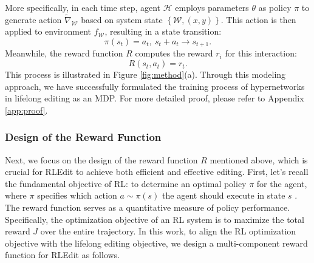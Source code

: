 More specifically, in each time step, agent $\mathcal{H}$ employs parameters $\theta$ as policy $\pi$ to generate action $\tilde{\nabla}_\mathcal{W}$ based on system state $\left\{\mathcal{W},\left(x,y\right)\right\}$. This action is then applied to environment $f_\mathcal{W}$, resulting in a state transition:
\begin{equation}
\pi (s_t)=a_t,\ s_t+a_t\rightarrow s_{t+1}.
\end{equation}
Meanwhile, the reward function $R$ computes the reward $r_i$ for this interaction:
\begin{equation}
R(s_t,a_t)=r_t.
\end{equation}
This process is illustrated in Figure \ref{fig:method}(a). Through this modeling approach, we have successfully formulated the training process of hypernetworks in lifelong editing as an MDP. For more detailed proof, please refer to Appendix \ref{app:proof}.

\subsubsection{Design of the Reward Function}
Next, we focus on the design of the reward function $R$ mentioned above, which is crucial for RLEdit to achieve both efficient and effective editing. First, let's recall the fundamental objective of RL: to determine an optimal policy $\pi$ for the agent, where $\pi$ specifies which action $a\sim\pi(s)$ the agent should execute in state $s$ \cite{rl}. The reward function serves as a quantitative measure of policy performance. Specifically, the optimization objective of an RL system is to maximize the total reward $J$ over the entire trajectory. In this work, to align the RL optimization objective with the lifelong editing objective, we design a multi-component reward function for RLEdit as follows.

